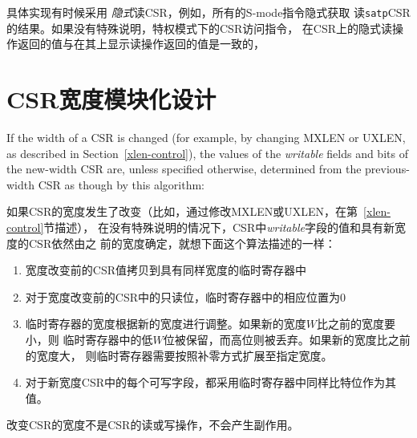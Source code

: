 具体实现有时候采用 {\em 隐式}读CSR，例如，所有的S-mode指令隐式获取
读{\tt satp}CSR的结果。如果没有特殊说明，特权模式下的CSR访问指令，
在CSR上的隐式读操作返回的值与在其上显示读操作返回的值是一致的，

\section{CSR宽度模块化设计
    }
\label{sec:csrwidthmodulation}

If the width of a CSR is changed (for example, by changing MXLEN or UXLEN, as
described in Section~\ref{xlen-control}), the values of the {\em writable}
fields and bits of the new-width CSR are, unless specified otherwise,
determined from the previous-width CSR as though by this algorithm:

如果CSR的宽度发生了改变（比如，通过修改MXLEN或UXLEN，在第~\ref{xlen-control}节描述），
在没有特殊说明的情况下，CSR中{\em writable}字段的值和具有新宽度的CSR依然由之
前的宽度确定，就想下面这个算法描述的一样：
\begin{enumerate}


\item 宽度改变前的CSR值拷贝到具有同样宽度的临时寄存器中


\item 对于宽度改变前的CSR中的只读位，临时寄存器中的相应位置为0


\item 临时寄存器的宽度根据新的宽度进行调整。如果新的宽度$W$比之前的宽度要小，则
临时寄存器中的低$W$位被保留，而高位则被丢弃。如果新的宽度比之前的宽度大，
则临时寄存器需要按照补零方式扩展至指定宽度。


\item 对于新宽度CSR中的每个可写字段，都采用临时寄存器中同样比特位作为其值。

\end{enumerate}


改变CSR的宽度不是CSR的读或写操作，不会产生副作用。
